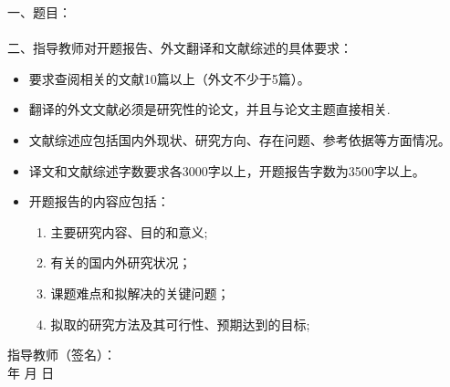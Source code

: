 
\newpage
\thispagestyle{empty}

\begin{tabbing}
\hspace{5mm}\songti\sihao 一、题目：\underline{}
\\ \\
\hspace{5mm}\songti\sihao 二、指导教师对开题报告、外文翻译和文献综述的具体要求：
\end{tabbing}
\begin{itemize}
\item 要求查阅相关的文献10篇以上（外文不少于5篇）。
\item 翻译的外文文献必须是研究性的论文，并且与论文主题直接相关.
\item 文献综述应包括国内外现状、研究方向、存在问题、参考依据等方面情况。
\item 译文和文献综述字数要求各3000字以上，开题报告字数为3500字以上。
\item 开题报告的内容应包括：
\begin{enumerate}
\item 主要研究内容、目的和意义;
\item 有关的国内外研究状况；
\item 课题难点和拟解决的关键问题；
\item 拟取的研究方法及其可行性、预期达到的目标;
\end{enumerate}
\end{itemize}
\vspace{60mm}

\begin{tabbing}
\hspace{80mm}\songti\xiaosi 指导教师（签名）：
\\ \hspace{90mm} \songti\xiaosi 年 \hspace{5mm} \songti\xiaosi 月 \hspace{5mm} \songti\xiaosi 日
\end{tabbing}

